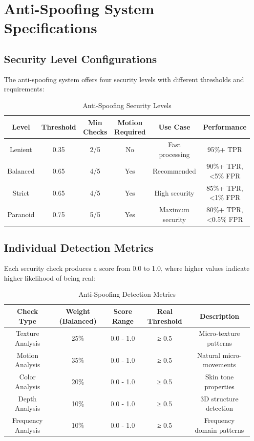 \documentclass[12pt,a4paper]{article}
\begin{document}
\section{Anti-Spoofing System Specifications}

\subsection{Security Level Configurations}

The anti-spoofing system offers four security levels with different thresholds and requirements:

\begin{table}[h!]
\centering
\caption{Anti-Spoofing Security Levels}
\begin{tabular}{|c|c|c|c|c|c|}
\hline
\textbf{Level} & \textbf{Threshold} & \textbf{Min Checks} & \textbf{Motion Required} & \textbf{Use Case} & \textbf{Performance} \\
\hline
Lenient & 0.35 & 2/5 & No & Fast processing & 95\%+ TPR \\
\hline
Balanced & 0.65 & 4/5 & Yes & Recommended & 90\%+ TPR, <5\% FPR \\
\hline
Strict & 0.65 & 4/5 & Yes & High security & 85\%+ TPR, <1\% FPR \\
\hline
Paranoid & 0.75 & 5/5 & Yes & Maximum security & 80\%+ TPR, <0.5\% FPR \\
\hline
\end{tabular}
\end{table}

\subsection{Individual Detection Metrics}

Each security check produces a score from 0.0 to 1.0, where higher values indicate higher likelihood of being real:

\begin{table}[h!]
\centering
\caption{Anti-Spoofing Detection Metrics}
\begin{tabular}{|c|c|c|c|c|}
\hline
\textbf{Check Type} & \textbf{Weight (Balanced)} & \textbf{Score Range} & \textbf{Real Threshold} & \textbf{Description} \\
\hline
Texture Analysis & 25\% & 0.0 - 1.0 & ≥ 0.5 & Micro-texture patterns \\
\hline
Motion Analysis & 35\% & 0.0 - 1.0 & ≥ 0.5 & Natural micro-movements \\
\hline
Color Analysis & 20\% & 0.0 - 1.0 & ≥ 0.5 & Skin tone properties \\
\hline
Depth Analysis & 10\% & 0.0 - 1.0 & ≥ 0.5 & 3D structure detection \\
\hline
Frequency Analysis & 10\% & 0.0 - 1.0 & ≥ 0.5 & Frequency domain patterns \\
\hline
\end{tabular}
\end{table}
\end{document}
